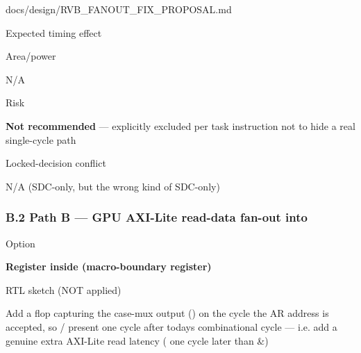 \begin{relocated}{docs/design/RVB_FANOUT_FIX_PROPOSAL.md}
\begin{rowtable}
\begin{rowcell}{Expected timing effect}
\end{rowcell}

\begin{rowcell}{Area/\allowbreak{}power}

N/A

\end{rowcell}

\begin{rowcell}{Risk}

\textbf{Not recommended} --- explicitly excluded per task instruction
not to hide a real single-cycle path

\end{rowcell}

\begin{rowcell}{Locked-decision conflict}

N/A (SDC-only, but the wrong kind of SDC-only)

\end{rowcell}

\end{rowtable}

\subsubsection{\texorpdfstring{B.2 Path B --- GPU AXI-Lite read-data
fan-out into
}{B.2 Path B --- GPU AXI-Lite read-data fan-out into }}\label{tm:pd:rvb-fanout-fix:b2-path-b-gpu-axi-lite-read-data-fan-out-into-u-periph-bridge}

\begin{rowtable}



\begin{rowcell}{Option}

\textbf{Register  inside 
(macro-boundary register)}

\end{rowcell}

\begin{rowcell}{RTL sketch (NOT applied)}

Add a flop capturing the  case-mux output
() on the cycle the AR address is accepted, so
/ present one cycle after
 today\textquotesingle s combinational cycle --- i.e. add
a genuine extra AXI-Lite read latency ( one cycle later
than \&)


\end{rowcell}
\end{rowtable}
\end{relocated}

